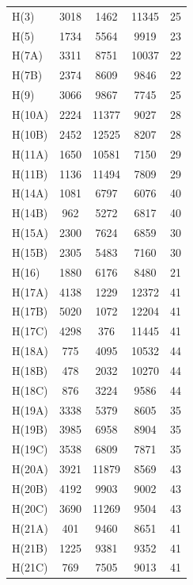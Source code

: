 \begin{center}
\tablelasttail{\bottomrule}
 {\footnotesize \singlespacing
\begin{supertabular}{lcccc}
H(3)&3018&1462&11345&25\\
H(5)&1734&5564&9919&23\\
H(7A)&3311&8751&10037&22\\
H(7B)&2374&8609&9846&22\\
H(9)&3066&9867&7745&25\\
H(10A)&2224&11377&9027&28\\
H(10B)&2452&12525&8207&28\\
H(11A)&1650&10581&7150&29\\
H(11B)&1136&11494&7809&29\\
H(14A)&1081&6797&6076&40\\
H(14B)&962&5272&6817&40\\
H(15A)&2300&7624&6859&30\\
H(15B)&2305&5483&7160&30\\
H(16)&1880&6176&8480&21\\
H(17A)&4138&1229&12372&41\\
H(17B)&5020&1072&12204&41\\
H(17C)&4298&376&11445&41\\
H(18A)&775&4095&10532&44\\
H(18B)&478&2032&10270&44\\
H(18C)&876&3224&9586&44\\
H(19A)&3338&5379&8605&35\\
H(19B)&3985&6958&8904&35\\
H(19C)&3538&6809&7871&35\\
H(20A)&3921&11879&8569&43\\
H(20B)&4192&9903&9002&43\\
H(20C)&3690&11269&9504&43\\
H(21A)&401&9460&8651&41\\
H(21B)&1225&9381&9352&41\\
H(21C)&769&7505&9013&41\\
\end{supertabular}
}
\end{center}


